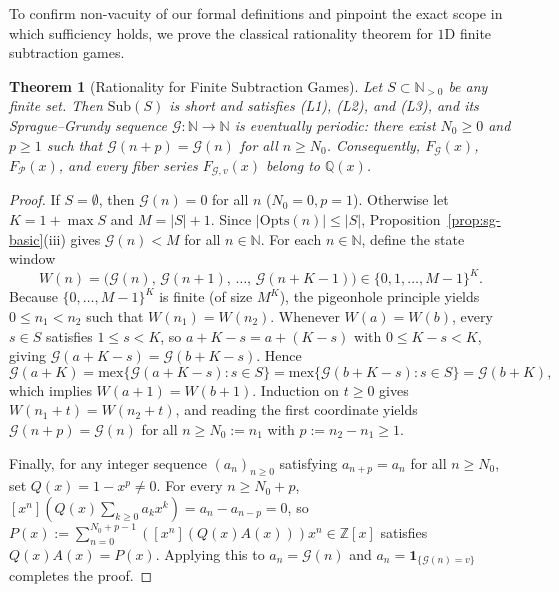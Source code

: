 \documentclass[11pt]{article}
\newtheorem{theorem}{Theorem}[section]
\theoremstyle{definition}
\theoremstyle{remark}
\newcommand{\N}{\mathbb{N}}
\newcommand{\Z}{\mathbb{Z}}
\newcommand{\Q}{\mathbb{Q}}
\newcommand{\G}{\mathcal{G}}
\newcommand{\Ppos}{\mathcal{P}}
\newcommand{\mex}{\mathrm{mex}}
\newcommand{\Opts}{\mathrm{Opts}}
\newcommand{\Sub}{\mathrm{Sub}}
\begin{document}
To confirm non-vacuity of our formal definitions and pinpoint the exact scope in which sufficiency holds, we prove the classical rationality theorem for $1$D finite subtraction games.

\begin{theorem}[Rationality for Finite Subtraction Games]
\label{thm:positive-sub}
Let $S \subset \N_{>0}$ be any finite set. Then $\Sub(S)$ is short and satisfies \textup{(L1)}, \textup{(L2)}, and \textup{(L3)}, and its Sprague--Grundy sequence $\G : \N \to \N$ is eventually periodic: there exist $N_0 \ge 0$ and $p \ge 1$ such that $\G(n+p) = \G(n)$ for all $n \ge N_0$. Consequently, $F_{\G}(x)$, $F_{\Ppos}(x)$, and every fiber series $F_{\G,v}(x)$ belong to $\Q(x)$.
\end{theorem}
\begin{proof}
If $S = \emptyset$, then $\G(n)=0$ for all $n$ ($N_0=0, p=1$). Otherwise let $K = 1 + \max S$ and $M = |S| + 1$. Since $|\Opts(n)| \le |S|$, Proposition~\ref{prop:sg-basic}(iii) gives $\G(n) < M$ for all $n \in \N$. For each $n \in \N$, define the state window
\[
  W(n) = \bigl(\G(n),\, \G(n+1),\, \dots,\, \G(n+K-1)\bigr) \in \{0,1,\dots,M-1\}^K.
\]
Because $\{0,\dots,M-1\}^K$ is finite (of size $M^K$), the pigeonhole principle yields $0 \le n_1 < n_2$ such that $W(n_1) = W(n_2)$. Whenever $W(a) = W(b)$, every $s \in S$ satisfies $1 \le s < K$, so $a + K - s = a + (K - s)$ with $0 \le K - s < K$, giving $\G(a + K - s) = \G(b + K - s)$. Hence
\[
  \G(a+K) = \mex\{\G(a+K-s) : s \in S\} = \mex\{\G(b+K-s) : s \in S\} = \G(b+K),
\]
which implies $W(a+1) = W(b+1)$. Induction on $t \ge 0$ gives $W(n_1+t) = W(n_2+t)$, and reading the first coordinate yields $\G(n + p) = \G(n)$ for all $n \ge N_0 := n_1$ with $p := n_2 - n_1 \ge 1$.

Finally, for any integer sequence $(a_n)_{n \ge 0}$ satisfying $a_{n+p} = a_n$ for all $n \ge N_0$, set $Q(x) = 1 - x^p \neq 0$. For every $n \ge N_0 + p$, $[x^n](Q(x)\sum_{k \ge 0} a_k x^k) = a_n - a_{n-p} = 0$, so $P(x) := \sum_{n=0}^{N_0+p-1} ([x^n](Q(x)A(x))) x^n \in \Z[x]$ satisfies $Q(x)A(x) = P(x)$. Applying this to $a_n = \G(n)$ and $a_n = \mathbf{1}_{\{\G(n)=v\}}$ completes the proof.
\end{proof}
\end{document}
